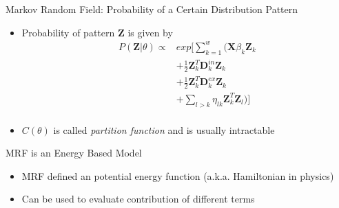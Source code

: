 \documentclass{beamer}
\begin{document}
\begin{frame}{Markov Random Field: Probability of a Certain Distribution Pattern}
\begin{itemize}
	\item Probability of pattern $\mathbf{Z}$ is given by
	\begin{equation}
	\begin{aligned}
	P(\mathbf{Z}|\theta)\propto &exp[ \sum_{k=1}^{w} (\mathbf{X}\beta_{k} \mathbf{Z}_{k}\\ 
	&+ \frac{1}{2}\mathbf{Z}_{k}^{T}\mathbf{D}_{k}^{in}\mathbf{Z}_{k}\\
	&+ \frac{1}{2}\mathbf{Z}_{k}^{T}\mathbf{D}_{k}^{ex}\mathbf{Z}_{k}\\
	&+ \sum_{l>k}\eta_{lk}\mathbf{Z}_{k}^{T}\mathbf{Z}_{l})]\\
	\end{aligned}
	\end{equation}
	\item $C(\theta)$ is called \textit{partition function} and is usually intractable
\end{itemize}
\end{frame}

\begin{frame}{MRF is an Energy Based Model}
	\begin{itemize}
		\item MRF defined an potential energy function (a.k.a. Hamiltonian in physics)
		\item Can be used to evaluate contribution of different terms
	\end{itemize}

\end{frame}

\end{document}

